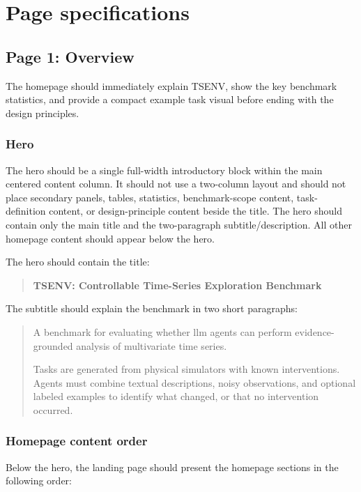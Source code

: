\documentclass[11pt]{article}
\begin{document}
\section*{Page specifications}
\label{sec:website-page-overview}
\subsection*{Page 1: Overview}

The homepage should immediately explain TSENV, show the key benchmark statistics, and provide a compact example task visual before ending with the design principles.

\subsubsection*{Hero}

The hero should be a single full-width introductory block within the main centered content column.
It should not use a two-column layout and should not place secondary panels, tables, statistics, benchmark-scope content, task-definition content, or design-principle content beside the title.
The hero should contain only the main title and the two-paragraph subtitle/description.
All other homepage content should appear below the hero.

The hero should contain the title:

\begin{quote}
\textbf{TSENV: Controllable Time-Series Exploration Benchmark}
\end{quote}

The subtitle should explain the benchmark in two short paragraphs:

\begin{quote}
A benchmark for evaluating whether llm agents can perform evidence-grounded analysis of multivariate time series.

Tasks are generated from physical simulators with known interventions.
Agents must combine textual descriptions, noisy observations, and optional labeled examples to identify what changed, or that no intervention occurred.
\end{quote}


\subsubsection*{Homepage content order}

Below the hero, the landing page should present the homepage sections in the following order:
\end{document}

